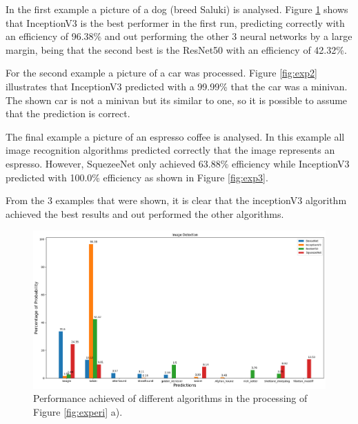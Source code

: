 In the first example a picture of a dog (breed Saluki) is analysed. Figure \ref{fig:exp1} shows that InceptionV3 is the best performer in the first run, predicting correctly with an efficiency of 96.38\% and out performing the other 3 neural networks by a large margin, being that the second best is the ResNet50 with an efficiency of 42.32\%.

For the second example a picture of a car was processed. Figure \ref{fig:exp2} illustrates that InceptionV3 predicted with a 99.99\% that the car was a minivan. The shown car is not a minivan but its similar to one, so it is possible to assume that the prediction is correct.

The final example a picture of an espresso coffee is analysed. In this example all image recognition algorithms predicted correctly that the image represents an espresso. However, SquezeeNet only achieved 63.88\% efficiency while InceptionV3 predicted with 100.0\% efficiency as shown in Figure \ref{fig:exp3}.

From the 3 examples that were shown, it is clear that the inceptionV3 algorithm achieved the best results and out performed the other algorithms.



\begin{figure}[H]
  \centering
  \captionsetup{justification=centering}
  \includegraphics[width=\textwidth]{Sections/4InitialWork/4_images/run1_res.png}
  \caption[Performance achieved of different algorithms]{Performance achieved of different algorithms in the processing of Figure \ref{fig:experi} a).} 
  \label{fig:exp1}
\end{figure}



